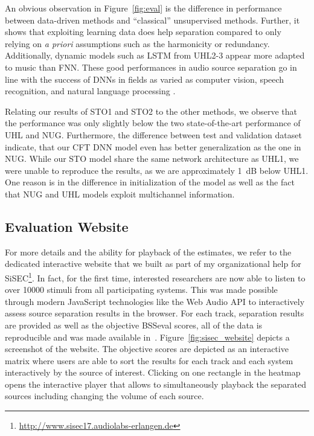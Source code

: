 An obvious observation in Figure~\ref{fig:eval} is the difference in performance between data-driven methods and ``classical'' unsupervised methods. 
Further, it shows that exploiting learning data does help separation compared to only relying on \textit{a priori} assumptions such as the harmonicity or redundancy. Additionally, dynamic models such as LSTM from UHL2-3 appear more adapted to music than FNN. 
These good performances in audio source separation go in line with the success of DNNs in fields as varied as computer vision, speech recognition, and natural language processing \cite{lecun15}.
\par
Relating our results of STO1 and STO2 to the other methods, we observe that the performance was only slightly below the two state-of-the-art performance of UHL and NUG.
Furthermore, the difference between test and validation dataset indicate, that our CFT DNN model even has better generalization as the one in NUG. 
While our STO model share the same network architecture as UHL1, we were unable to reproduce the results, as we are approximately 1~dB below UHL1.
One reason is in the difference in initialization of the model as well as the fact that NUG and UHL models exploit multichannel information. 

\subsection{Evaluation Website}
\label{ssec:evaluation Website}

For more details and the ability for playback of the estimates, we refer to the dedicated interactive website that we built as part of my organizational help for SiSEC\footnote{\url{http://www.sisec17.audiolabs-erlangen.de}}.
In fact, for the first time, interested researchers are now able to listen to over 10000 stimuli from all participating systems.
This was made possible through modern JavaScript technologies like the Web Audio API to interactively assess source separation results in the browser.
For each track, separation results are provided as well as the objective BSSeval scores, all of the data is reproducible and was made available in~\cite{oss_sisecwebsite}.
Figure~\ref{fig:sisec_website} depicts a screenshot of the website.
The objective scores are depicted as an interactive matrix where users are able to sort the results for each track and each system interactively by the source of interest.
Clicking on one rectangle in the heatmap opens the interactive player that allows to simultaneously playback the separated sources including changing the volume of each source.

